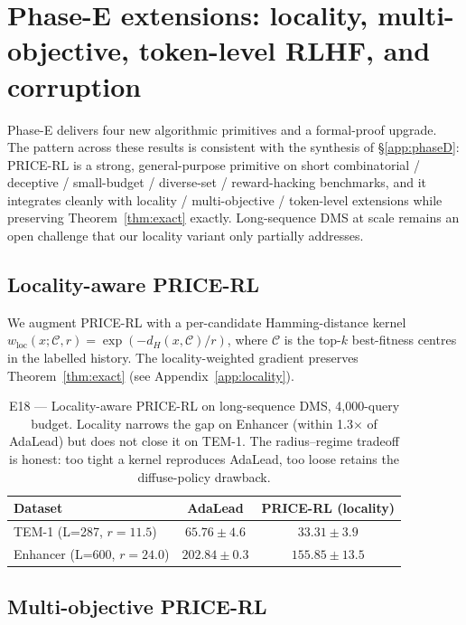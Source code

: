 \section{Phase-E extensions: locality, multi-objective, token-level RLHF, and corruption}
\label{app:phaseE}

Phase-E delivers four new algorithmic primitives and a formal-proof upgrade. The pattern across these results is consistent with the synthesis of §\ref{app:phaseD}: PRICE-RL is a strong, general-purpose primitive on short combinatorial / deceptive / small-budget / diverse-set / reward-hacking benchmarks, and it integrates cleanly with locality / multi-objective / token-level extensions while preserving Theorem~\ref{thm:exact} exactly. Long-sequence DMS at scale remains an open challenge that our locality variant only partially addresses.

\subsection{Locality-aware PRICE-RL}
\label{sec:e18}

We augment PRICE-RL with a per-candidate Hamming-distance kernel $w_{\mathrm{loc}}(x; \mathcal C, r) = \exp(-d_H(x, \mathcal C)/r)$, where $\mathcal C$ is the top-$k$ best-fitness centres in the labelled history. The locality-weighted gradient preserves Theorem~\ref{thm:exact} (see Appendix~\ref{app:locality}).

\begin{table}[t]
\centering
\caption{E18 --- Locality-aware PRICE-RL on long-sequence DMS, 4{,}000-query budget. Locality narrows the gap on Enhancer (within 1.3$\times$ of AdaLead) but does not close it on TEM-1. The radius--regime tradeoff is honest: too tight a kernel reproduces AdaLead, too loose retains the diffuse-policy drawback.}
\label{tab:e18}
\begin{tabular}{lcc}
\toprule
Dataset & AdaLead & PRICE-RL (locality) \\
\midrule
TEM-1 (L=287, $r=11.5$)        & $\mathbf{65.76 \pm 4.6}$  & $33.31 \pm 3.9$ \\
Enhancer (L=600, $r=24.0$)     & $\mathbf{202.84 \pm 0.3}$ & $155.85 \pm 13.5$ \\
\bottomrule
\end{tabular}
\end{table}

\subsection{Multi-objective PRICE-RL}
\label{sec:e19}

